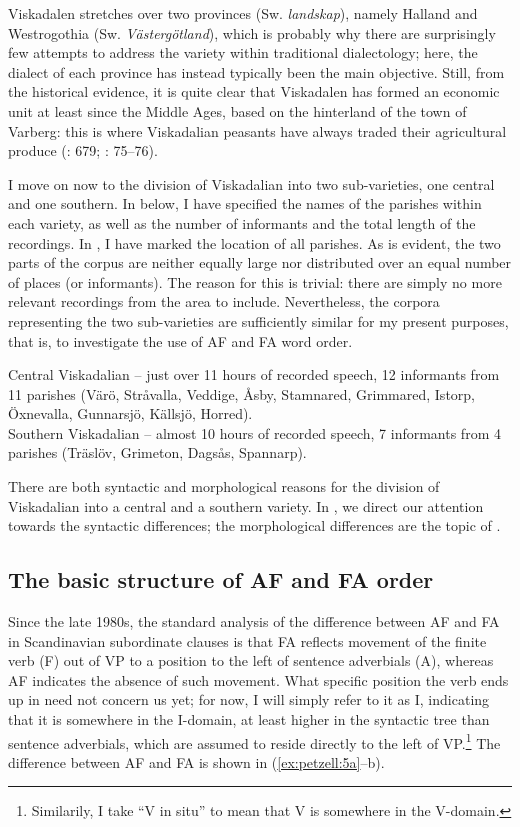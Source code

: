 \documentclass[output=paper,colorlinks,citecolor=brown,draft,draftmode]{langscibook}
\begin{document}
Viskadalen stretches over two provinces (Sw. \textit{landskap}), namely Halland and Westrogothia (Sw. \textit{Västergötland}), which is probably why there are surprisingly few attempts to address the variety within traditional dialectology; here, the dialect of each province has instead typically been the main objective. Still, from the historical evidence, it is quite clear that Viskadalen has formed an economic unit at least since the Middle Ages, based on the hinterland of the town of Varberg: this is where Viskadalian peasants have always traded their agricultural produce (\citealt{Grill1954}: 679; \citealt{Linge1969}: 75–76).



I move on now to the division of Viskadalian into two sub-varieties, one central and one southern. In  below, I have specified the names of the parishes within each variety, as well as the number of informants and the total length of the recordings. In , I have marked the location of all parishes. As is evident, the two parts of the corpus are neither equally large nor distributed over an equal number of places (or informants). The reason for this is trivial: there are simply no more relevant recordings from the area to include. Nevertheless, the corpora representing the two sub-varieties are sufficiently similar for my present purposes, that is, to investigate the use of AF and FA word order.


\ea\label{ex:petzell:4}
\ea  Central Viskadalian – just over 11 hours of recorded speech, 12 informants from 11 parishes (Värö, Stråvalla, Veddige, Åsby, Stamnared, Grimmared, Istorp, Öxnevalla, Gunnarsjö, Källsjö, Horred).  \\
\ex\label{ex:petzell:4b}  Southern Viskadalian – almost 10 hours of recorded speech, 7 informants from 4 parishes (Träslöv, Grimeton, Dagsås, Spannarp).
\z
\z


There are both syntactic and morphological reasons for the division of Viskadalian into a central and a southern variety. In , we direct our attention towards the syntactic differences; the morphological differences are the topic of .


\subsection{The basic structure of AF and FA order}\label{sec:petzell:2.2}


Since the late 1980s, the standard analysis of the difference between AF and FA in Scandinavian subordinate clauses is that FA reflects movement of the finite verb (F) out of VP to a position to the left of sentence adverbials (A), whereas AF indicates the absence of such movement. What specific position the verb ends up in need not concern us yet; for now, I will simply refer to it as I, indicating that it is somewhere in the I-domain, at least higher in the syntactic tree than sentence adverbials, which are assumed to reside directly to the left of VP.\footnote{Similarily, I take “V in situ” to mean that V is somewhere in the V-domain.} The difference between AF and FA is shown in (\ref{ex:petzell:5a}–b).
\end{document}
